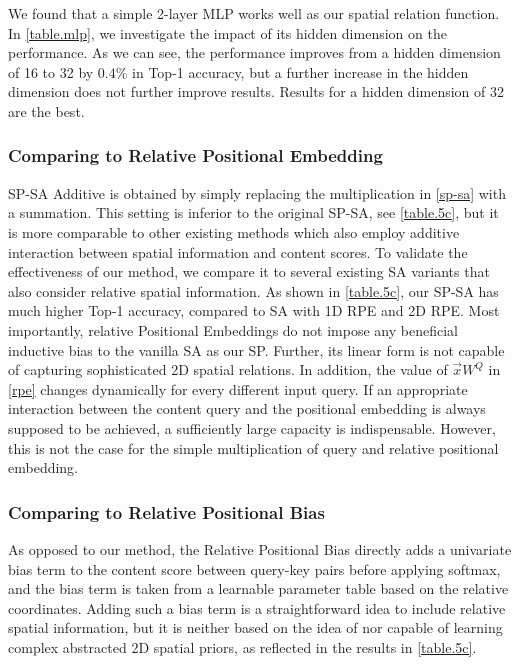 \documentclass[authorversion, sigconf, acmthm=false, nonacm=true]{acmart}
\begin{document}
We found that a simple 2-layer MLP works well as our spatial relation function. In \cref{table.mlp}, we investigate the impact of its hidden dimension on the performance. As we can see, the performance improves from a hidden dimension of 16 to 32 by $0.4\%$ in Top-1 accuracy, but a further increase in the hidden dimension does not further improve results. Results for a hidden dimension of 32 are the best.

\subsubsection{Comparing to Relative Positional Embedding}





SP-SA Additive is obtained by simply replacing the multiplication in \cref{sp-sa} with a summation. 
This setting is inferior to the original SP-SA, see \cref{table.5c}, but it is more comparable to other existing methods which also 
employ additive interaction between spatial information and content scores. 
To validate the effectiveness of our method, we compare it to several existing SA variants that also consider relative spatial information. 
As shown in \cref{table.5c}, our SP-SA has much higher Top-1 accuracy, compared to SA with 1D RPE and 2D RPE. 
Most importantly, relative Positional Embeddings do not impose any beneficial inductive bias to the vanilla SA as our SP. Further, its linear form is not capable of 
capturing sophisticated 2D spatial relations.
In addition, the value of $\vec{x}W^Q$ in \cref{rpe} changes dynamically for every different input query.
If an appropriate interaction between the content query and the positional embedding is always supposed to be achieved, a sufficiently large capacity is indispensable. 
However, this is not the case for the simple 
multiplication of query and relative positional embedding.

\subsubsection{Comparing to Relative Positional Bias}
As opposed to our method, the Relative Positional Bias \cite{liu2021swin} directly adds a univariate bias term to the content score between query-key pairs before applying softmax, 
and the bias term is taken from a learnable parameter table based on the relative coordinates.
Adding such a bias term is a straightforward idea to include relative spatial information, 
but it is neither based on the idea of nor capable of learning complex abstracted 2D spatial priors,  
as reflected in the results in \cref{table.5c}.     
\end{document}
